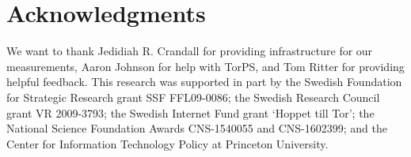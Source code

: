 \section*{Acknowledgments}
We want to thank Jedidiah R. Crandall for providing infrastructure for our
measurements, Aaron Johnson for help with TorPS, and Tom Ritter for providing
helpful feedback.
%
This research was supported in part by the Swedish Foundation for Strategic
Research grant SSF FFL09-0086; the Swedish Research Council grant VR 2009-3793;
the Swedish Internet Fund grant `Hoppet till Tor'; the National Science
Foundation Awards CNS-1540055 and CNS-1602399; and the Center for Information
Technology Policy at Princeton University.
